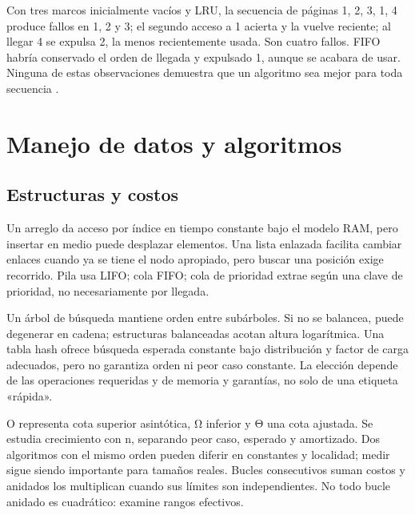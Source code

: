 Con tres marcos inicialmente vacíos y LRU, la secuencia de páginas 1, 2, 3, 1, 4 produce fallos en 1, 2 y 3; el segundo acceso a 1 acierta y la vuelve reciente; al llegar 4 se expulsa 2, la menos recientemente usada. Son cuatro fallos. FIFO habría conservado el orden de llegada y expulsado 1, aunque se acabara de usar. Ninguna de estas observaciones demuestra que un algoritmo sea mejor para toda secuencia \cite[capítulos Paging y Swapping Policies]{ostep}.


\section{Manejo de datos y algoritmos}\label{sec:s3}
\subsection{Estructuras y costos}
Un arreglo da acceso por índice en tiempo constante bajo el modelo RAM, pero insertar en medio puede desplazar elementos. Una lista enlazada facilita cambiar enlaces cuando ya se tiene el nodo apropiado, pero buscar una posición exige recorrido. Pila usa LIFO; cola FIFO; cola de prioridad extrae según una clave de prioridad, no necesariamente por llegada.

Un árbol de búsqueda mantiene orden entre subárboles. Si no se balancea, puede degenerar en cadena; estructuras balanceadas acotan altura logarítmica. Una tabla hash ofrece búsqueda esperada constante bajo distribución y factor de carga adecuados, pero no garantiza orden ni peor caso constante. La elección depende de las operaciones requeridas y de memoria y garantías, no solo de una etiqueta «rápida».

O representa cota superior asintótica, Ω inferior y Θ una cota ajustada. Se estudia crecimiento con n, separando peor caso, esperado y amortizado. Dos algoritmos con el mismo orden pueden diferir en constantes y localidad; medir sigue siendo importante para tamaños reales. Bucles consecutivos suman costos y anidados los multiplican cuando sus límites son independientes. No todo bucle anidado es cuadrático: examine rangos efectivos.

